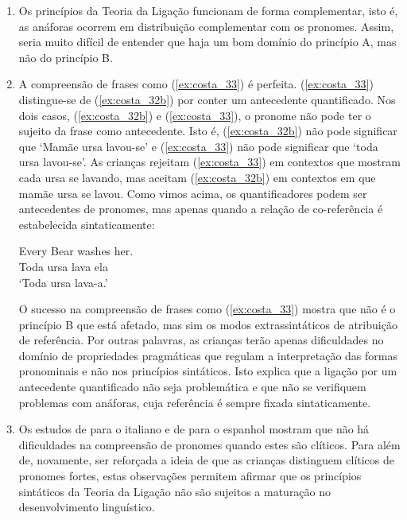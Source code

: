 \documentclass[output=paper]{LSP/langsci}
\begin{document}
\begin{enumerate}[label=\alph*)]
\item Os princípios da Teoria da Ligação funcionam de forma complementar, isto é, as anáforas ocorrem em distribuição complementar com os pronomes. Assim, seria muito difícil de entender que haja um bom domínio do princípio A, mas não do princípio B.
\item A compreensão de frases como (\ref{ex:costa_33}) é perfeita. (\ref{ex:costa_33}) distingue-se de (\ref{ex:costa_32b}) por conter um antecedente quantificado. Nos dois casos, (\ref{ex:costa_32b}) e (\ref{ex:costa_33}), o pronome não pode ter o sujeito da frase como antecedente. Isto é, (\ref{ex:costa_32b}) não pode significar que `Mamãe ursa lavou-se’ e (\ref{ex:costa_33}) não pode significar que `toda ursa lavou-se’. As crianças rejeitam (\ref{ex:costa_33}) em contextos que mostram cada ursa se lavando, mas aceitam (\ref{ex:costa_32b}) em contextos em que mamãe ursa se lavou.  Como vimos acima, os quantificadores podem ser antecedentes de pronomes, mas apenas quando a relação de co-referência é estabelecida sintaticamente:

\ea\label{ex:costa_33}
\gll Every Bear washes her.\\
Toda ursa lava ela\\
\glt `Toda ursa lava-a.'
\z

O sucesso na compreensão de frases como (\ref{ex:costa_33}) mostra que não é o princípio B que está afetado, mas sim os modos extrassintáticos de atribuição de referência. Por outras palavras, as crianças terão apenas dificuldades no domínio de propriedades pragmáticas que regulam a interpretação das formas pronominais e não nos princípios sintáticos. Isto explica que a ligação por um antecedente quantificado não seja problemática e que não se verifiquem problemas com anáforas, cuja referência é sempre fixada sintaticamente.

\item Os estudos de \citet{mckee1992} para o italiano e de \citet{padilla1990} para o espanhol  mostram que não há dificuldades na compreensão de pronomes quando estes são clíticos. Para além de, novamente, ser reforçada a ideia de que as crianças distinguem clíticos de pronomes fortes, estas observações permitem afirmar que os princípios sintáticos da Teoria da Ligação não são sujeitos a maturação no desenvolvimento linguístico.

\end{enumerate}
\end{document}
